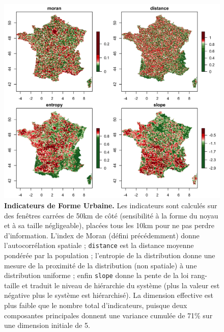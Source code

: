 \bigskip



\begin{figure}%
\centering
\includegraphics[width=\textwidth]{figures/morpho_indics_morpho_discrquantiles}
\caption{\textbf{Indicateurs de Forme Urbaine.} Les indicateurs sont calculés sur des fenêtres carrées de 50km de côté (sensibilité à la forme du noyau et à sa taille négligeable), placées tous les 10km pour ne pas perdre d'information. L'index de Moran (défini précédemment) donne l'autocorrélation spatiale ; \texttt{distance} est la distance moyenne pondérée par la population ; l'entropie de la distribution donne une mesure de la proximité de la distribution (non spatiale) à une distribution uniforme ; enfin \texttt{slope} donne la pente de la loi rang-taille et traduit le niveau de hiérarchie du système (plus la valeur est négative plus le système est hiérarchisé). La dimension effective est plus faible que le nombre total d'indicateurs, puisque deux composantes principales donnent une variance cumulée de 71\% sur une dimension initiale de 5.}
\label{fig:indics-morph}
\end{figure}


